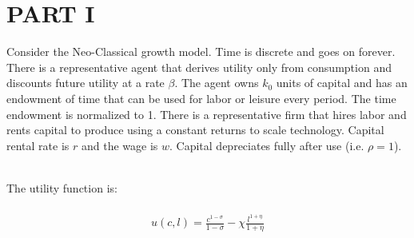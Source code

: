 \documentclass[a4paper]{article}
\begin{document}



\section{PART I}

Consider the Neo-Classical growth model. Time is discrete and goes on forever. There is a representative agent that derives utility only from consumption and discounts future utility at a rate $\beta$. The agent owns $k_0$ units of capital and has an endowment of time that can be used for labor or leisure every period. The time endowment is normalized to 1. There is a representative firm that hires labor and rents capital to produce using a constant returns to scale technology. Capital rental rate is $r$ and the wage is $w$. Capital depreciates fully after use (i.e. $\rho = 1$).\\~\

The utility function is:\\~\
\begin{align*}
u(c,l) = \frac{c^{1-\sigma}}{1-\sigma} - \chi \frac{l^{1+\eta}}{1+\eta}
\end{align*}
\end{document}

